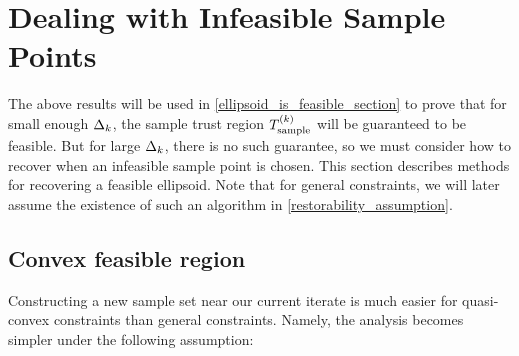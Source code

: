 \section{Dealing with Infeasible Sample Points}
\label{recovering_feasiblity_section}

The above results will be used in \cref{ellipsoid_is_feasible_section} to prove that for small enough $\Delta_k$, 
the sample trust region ${T_{\text{sample}}^{(k)}}$ will be guaranteed to be feasible.
But for large $\Delta_k$, there is no such guarantee, so we must consider how to recover when an infeasible sample point is chosen.
This section describes methods for recovering a feasible ellipsoid.
Note that for general constraints, we will later assume the existence of such an algorithm in \cref{restorability_assumption}.

\subsection{Convex feasible region}
\label{convex_restoration}
%

Constructing a new sample set near our current iterate is much easier for quasi-convex constraints than general constraints.
Namely, the analysis becomes simpler under the following assumption:


